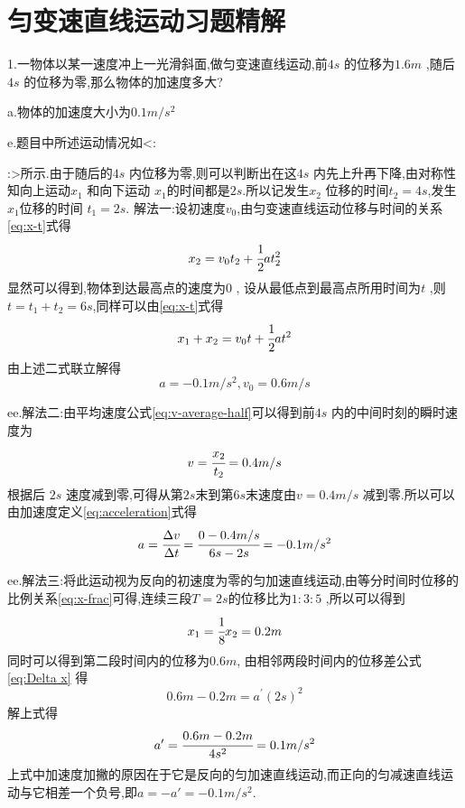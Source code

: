 \section{匀变速直线运动习题精解}
\begin{calculate}
  1.一物体以某一速度冲上一光滑斜面,做匀变速直线运动,前$4s$ 的位移为$1.6m$ ,随后$4s$ 的位移为零,那么物体的加速度多大?

  a.物体的加速度大小为$0.1m/s^2$

  e.题目中所述运动情况如<:
  :>所示.由于随后的$4s$ 内位移为零,则可以判断出在这$4s$ 内先上升再下降,由对称性知向上运动$x_1$ 和向下运动 $x_1$的时间都是$2s$.所以记发生$x_2$ 位移的时间$t_2=4s$,发生$x_1$位移的时间 $t_1=2s$.
  \newline
  解法一:设初速度$v_0$,由匀变速直线运动位移与时间的关系\eqref{eq:x-t}式得
  $$x_2=v_0t_2+\cfrac{1}{2}at_2^2$$
  显然可以得到,物体到达最高点的速度为$0$ , 设从最低点到最高点所用时间为$t$ ,则$t=t_1+t_2=6s$,同样可以由\eqref{eq:x-t}式得
  $$x_1+x_2=v_0t+\cfrac{1}{2}at^2$$
  由上述二式联立解得
  \newline
  $$a=-0.1m/s^2 , v_0=0.6m/s$$

  ee.解法二:由平均速度公式\eqref{eq:v-average-half}可以得到前$4s$ 内的中间时刻的瞬时速度为 
  $$v=\cfrac{x_2}{t_2}=0.4m/s$$
  根据后 $2s$ 速度减到零,可得从第$2s$末到第$6s$末速度由$v=0.4m/s$ 减到零.所以可以由加速度定义\eqref{eq:acceleration}式得
  $$a=\cfrac{\Delta v}{\Delta t}=\cfrac{0-0.4m/s}{6s-2s}=-0.1m/s^2$$

  ee.解法三:将此运动视为反向的初速度为零的匀加速直线运动,由等分时间时位移的比例关系\eqref{eq:x-frac}可得,连续三段$T=2s$的位移比为$1:3:5$ ,所以可以得到
  $$x_1=\cfrac{1}{8}x_2=0.2m$$
 同时可以得到第二段时间内的位移为$0.6m$, 由相邻两段时间内的位移差公式\eqref{eq:Delta x} 得
  $$0.6m-0.2m=a^\prime (2s)^2$$
  解上式得
  $$a^\prime =\cfrac{0.6m-0.2m}{4s^2}=0.1m/s^2$$
  上式中加速度加撇的原因在于它是反向的匀加速直线运动,而正向的匀减速直线运动与它相差一个负号,即$a=-a'=-0.1m/s^2$.


\end{calculate}

